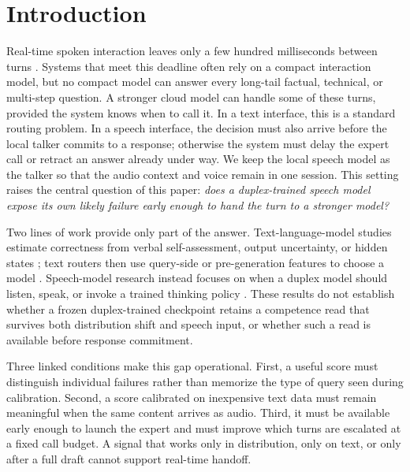 \section{Introduction}
\label{sec:intro}

Real-time spoken interaction leaves only a few hundred milliseconds
between turns \citep{stivers2009universals}. Systems that meet this
deadline often rely on a compact interaction model, but no compact model
can answer every long-tail factual, technical, or multi-step question.
A stronger cloud model can handle some of these turns, provided the
system knows when to call it. In a text interface, this is a standard
routing problem. In a speech interface, the decision must also arrive
before the local talker commits to a response; otherwise the system must
delay the expert call or retract an answer already under way. We keep the
local speech model as the talker so that the audio context and voice
remain in one session. This setting raises the central question of this
paper: \emph{does a duplex-trained speech model expose its own likely
failure early enough to hand the turn to a stronger model?}

Two lines of work provide only part of the answer. Text-language-model
studies estimate correctness from verbal self-assessment, output
uncertainty, or hidden states
\citep{kadavath2022language,azaria2023internal,burns2023discovering,
kossen2024semantic}; text routers then use query-side or pre-generation
features to choose a model
\citep{ong2024routellm,varshney2026llmrouter,lugoloobi2026failures}.
Speech-model research instead focuses on when a duplex model should
listen, speak, or invoke a trained thinking policy
\citep{wang2024fsm,bayling2026duplex,huang2026duplexomni}. These results
do not establish whether a frozen duplex-trained checkpoint retains a
competence read that survives both distribution shift and speech input,
or whether such a read is available before response commitment.

Three linked conditions make this gap operational. First, a useful score
must distinguish individual failures rather than memorize the type of
query seen during calibration. Second, a score calibrated on inexpensive
text data must remain meaningful when the same content arrives as audio.
Third, it must be available early enough to launch the expert and must
improve which turns are escalated at a fixed call budget. A signal that
works only in distribution, only on text, or only after a full draft
cannot support real-time handoff.

